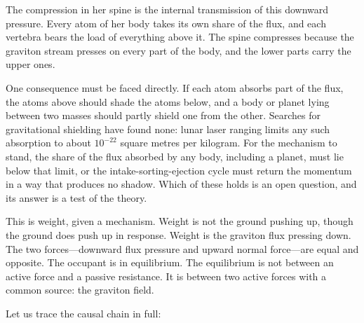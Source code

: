 \documentclass[11pt]{article}
\begin{document}
The compression in her spine is the internal transmission of this downward pressure. Every atom of her body takes its own share of the flux, and each vertebra bears the load of everything above it. The spine compresses because the graviton stream presses on every part of the body, and the lower parts carry the upper ones.

One consequence must be faced directly. If each atom absorbs part of the flux, the atoms above should shade the atoms below, and a body or planet lying between two masses should partly shield one from the other. Searches for gravitational shielding have found none: lunar laser ranging limits any such absorption to about \(10^{-22}\) square metres per kilogram. For the mechanism to stand, the share of the flux absorbed by any body, including a planet, must lie below that limit, or the intake-sorting-ejection cycle must return the momentum in a way that produces no shadow. Which of these holds is an open question, and its answer is a test of the theory.

This is weight, given a mechanism. Weight is not the ground pushing up, though the ground does push up in response. Weight is the graviton flux pressing down. The two forces---downward flux pressure and upward normal force---are equal and opposite. The occupant is in equilibrium. The equilibrium is not between an active force and a passive resistance. It is between two active forces with a common source: the graviton field.

Let us trace the causal chain in full:
\end{document}

